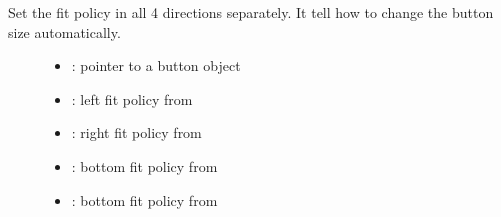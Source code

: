 \documentclass[letterpaper,10pt,english]{sphinxmanual}
\begin{document}
\begin{fulllineitems}
\label{\detokenize{object-types/btn:_CPPv415lv_btn_set_fit4P8lv_obj_t8lv_fit_t8lv_fit_t8lv_fit_t8lv_fit_t}}%
\pysigstartmultiline
{}\label{\detokenize{object-types/btn:lv__btn_8h_1aec9f3495266585a143f283d7effa518a}}%
\pysigstopmultiline
Set the fit policy in all 4 directions separately. It tell how to change the button size automatically. \begin{description}
\item[{}] \leavevmode\begin{itemize}
\item {} 
: pointer to a button object 

\item {} 
: left fit policy from  

\item {} 
: right fit policy from  

\item {} 
: bottom fit policy from  

\item {} 
: bottom fit policy from  

\end{itemize}

\end{description}


\end{fulllineitems}

\end{document}
